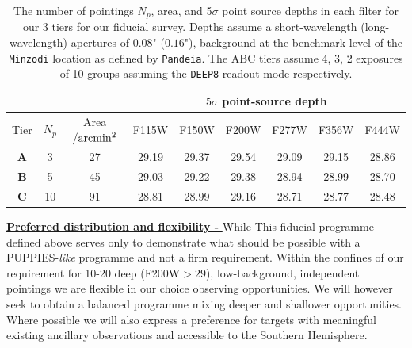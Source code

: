 \documentclass[12pt]{article}
\begin{document}
\begin{table}[h!]
\footnotesize
\begin{center}
\begin{tabular}{ |c|c|c|c|c|c|c|c|c| } 
\hline
\multicolumn{3}{|c|}{} & \multicolumn{6}{|c|}{$5\sigma$ point-source depth} \\
 \hline
Tier & $N_{p}$ & Area$/{\rm arcmin^2}$ & F115W & F150W & F200W & F277W & F356W & F444W \\
\hline
\textbf{A} & 3 & 27 & 29.19 & 29.37 & 29.54 & 29.09 & 29.15 & 28.86 \\
\textbf{B} & 5 & 45 & 29.03 & 29.22 & 29.38 & 28.94 & 28.99 & 28.70 \\
\textbf{C} & 10 & 91 & 28.81 & 28.99 & 29.16 & 28.71 & 28.77 & 28.48 \\
\hline
\end{tabular}
\end{center}
\vspace{-5mm}
\caption{The number of pointings $N_p$, area, and 5$\sigma$ point source depths in each filter for our 3 tiers for our fiducial survey.  Depths assume a short-wavelength (long-wavelength) apertures of $0.08$" ($0.16$"), background at the benchmark level of the \texttt{Minzodi} location as defined by \texttt{Pandeia}. The ABC tiers assume 4, 3, 2 exposures of 10 groups assuming the \texttt{DEEP8} readout mode respectively.}
\end{table}

\noindent
\underline{\bf Preferred distribution and flexibility - } While 
This fiducial programme defined above serves only to demonstrate what should be possible with a PUPPIES-\emph{like} programme and not a firm requirement. Within the confines of our requirement for 10-20 deep (F200W$>29$), low-background, independent pointings we are flexible in our choice observing opportunities. We will however seek to obtain a balanced programme mixing deeper and shallower opportunities. Where possible we will also express a preference for targets with meaningful existing ancillary observations and accessible to the Southern Hemisphere.


%
%
\specialreq             %
\end{document}
